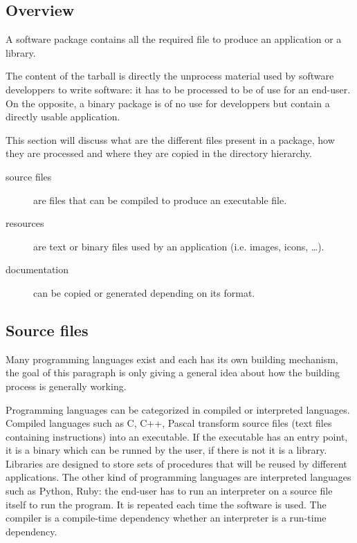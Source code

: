 \subsection{Overview}

A software package contains all the required file to produce an
application or a library.


The content of the tarball is directly the unprocess material used by
software developpers to write software: it has to be processed to be
of use for an end-user. On the opposite, a binary package is of no use
for developpers but contain a directly usable application.


This section will discuss what are the different files present in a
package, how they are processed and where they are copied in the
directory hierarchy.


\begin{description}
\item[source files] are files that can be compiled to produce an
  executable file.
\item[resources] are text or binary files used by an application
  (i.e. images, icons, \ldots).
\item[documentation] can be copied or generated depending on its
  format.
\end{description}


\subsection{Source files}


Many programming languages exist and each has its own building
mechanism, the goal of this paragraph is only giving a general idea
about how the building process is generally working.


Programming languages can be categorized in compiled or interpreted
languages. Compiled languages such as C, C++, Pascal transform source
files (text files containing instructions) into an executable. If the
executable has an entry point, it is a binary which can be runned by
the user, if there is not it is a library. Libraries are designed to
store sets of procedures that will be reused by different
applications.  The other kind of programming languages are interpreted
languages such as Python, Ruby: the end-user has to run an interpreter
on a source file itself to run the program. It is repeated each time
the software is used.
The compiler is a compile-time dependency whether an interpreter is a
run-time dependency.


